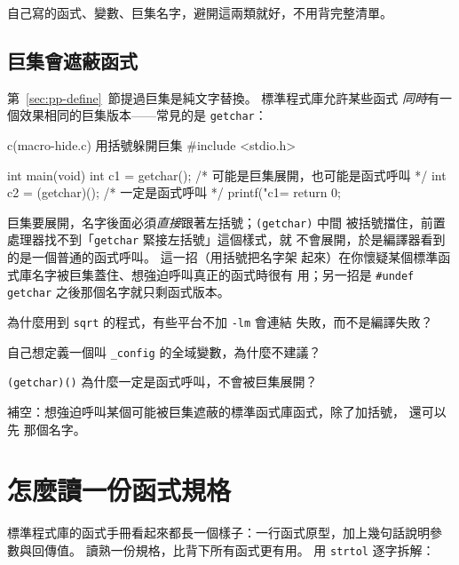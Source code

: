 自己寫的函式、變數、巨集名字，避開這兩類就好，不用背完整清單。

\subsection{巨集會遮蔽函式}

第~\ref{sec:pp-define}~節提過巨集是純文字替換。 標準程式庫允許某些函式
\textit{同時}有一個效果相同的巨集版本——常見的是 \texttt{getchar}：

\begin{example}{c}{(macro-hide.c) 用括號躲開巨集}
#include <stdio.h>

int main(void) {
    int c1 = getchar();       /* 可能是巨集展開，也可能是函式呼叫 */
    int c2 = (getchar)();     /* 一定是函式呼叫 */
    printf("c1=%
    return 0;
}
\end{example}

巨集要展開，名字後面必須\textit{直接}跟著左括號；\texttt{(getchar)} 中間
被括號擋住，前置處理器找不到「\texttt{getchar} 緊接左括號」這個樣式，就
不會展開，於是編譯器看到的是一個普通的函式呼叫。 這一招（用括號把名字架
起來）在你懷疑某個標準函式庫名字被巨集蓋住、想強迫呼叫真正的函式時很有
用；另一招是 \texttt{\#undef getchar} 之後那個名字就只剩函式版本。


\begin{drills}[label=drills:sl-what]
\item 為什麼用到 \texttt{sqrt} 的程式，有些平台不加 \texttt{-lm} 會連結
失敗，而不是編譯失敗？
\item 自己想定義一個叫 \texttt{\_config} 的全域變數，為什麼不建議？
\item \texttt{(getchar)()} 為什麼一定是函式呼叫，不會被巨集展開？
\item 補空：想強迫呼叫某個可能被巨集遮蔽的標準函式庫函式，除了加括號，
還可以先 \underline{\hspace{2em}} 那個名字。
\end{drills}

\section{怎麼讀一份函式規格}
\label{sec:sl-spec}

標準程式庫的函式手冊看起來都長一個樣子：一行函式原型，加上幾句話說明參
數與回傳值。 讀熟一份規格，比背下所有函式更有用。 用 \texttt{strtol}
逐字拆解：

